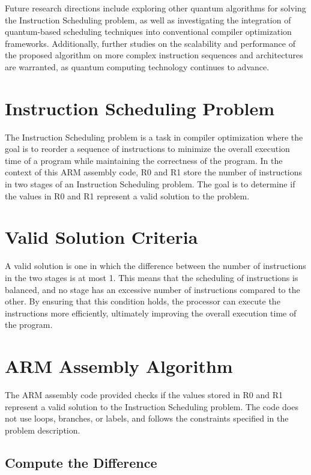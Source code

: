 Future research directions include exploring other quantum algorithms for solving the Instruction Scheduling problem, as well as investigating the integration of quantum-based scheduling techniques into conventional compiler optimization frameworks. Additionally, further studies on the scalability and performance of the proposed algorithm on more complex instruction sequences and architectures are warranted, as quantum computing technology continues to advance.

\section{Instruction Scheduling Problem}

The Instruction Scheduling problem is a task in compiler optimization where the goal is to reorder a sequence of instructions to minimize the overall execution time of a program while maintaining the correctness of the program. In the context of this ARM assembly code, R0 and R1 store the number of instructions in two stages of an Instruction Scheduling problem. The goal is to determine if the values in R0 and R1 represent a valid solution to the problem.

\section{Valid Solution Criteria}

A valid solution is one in which the difference between the number of instructions in the two stages is at most 1. This means that the scheduling of instructions is balanced, and no stage has an excessive number of instructions compared to the other. By ensuring that this condition holds, the processor can execute the instructions more efficiently, ultimately improving the overall execution time of the program.

\section{ARM Assembly Algorithm}

The ARM assembly code provided checks if the values stored in R0 and R1 represent a valid solution to the Instruction Scheduling problem. The code does not use loops, branches, or labels, and follows the constraints specified in the problem description.

\subsection{Compute the Difference}

